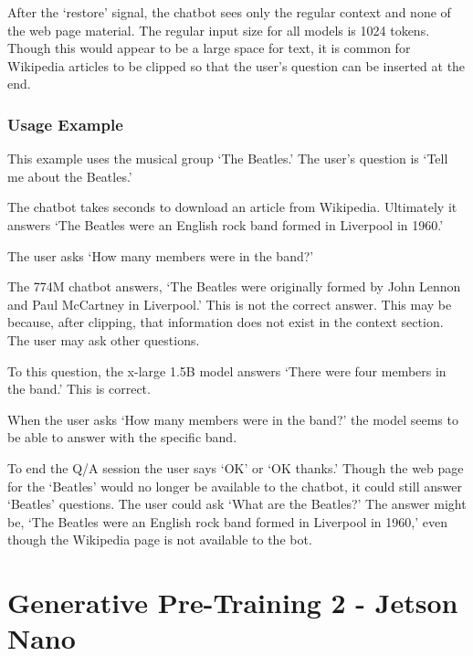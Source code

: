 
After the `restore' signal, the chatbot sees only the regular context and none of the web page material. The regular input size for all models is 1024 tokens. %
Though this would appear to be a large space for text, it is common for Wikipedia articles to be clipped so that the user's question can be inserted at the end.

\subsubsection{Usage Example}

This example uses the musical group `The Beatles.' The user's question is `Tell me about the Beatles.'

The chatbot takes seconds to download an article from Wikipedia. Ultimately it answers `The Beatles were an English rock band formed in Liverpool in 1960.'

The user asks `How many members were in the band?'

The 774M chatbot answers, `The Beatles were originally formed by John Lennon and Paul McCartney in Liverpool.' This is not the correct answer. This may be because, after clipping, that information does not exist in the context section. The user may ask other questions. %

To this question, the x-large 1.5B model answers `There were four members in the band.' This is correct.

When the user asks `How many members were in the band?' the model seems to be able to answer with the specific band. %

To end the Q/A session the user says `OK' or `OK thanks.' Though the web page for the `Beatles' would no longer be available to the chatbot, it could still answer `Beatles'  questions. The user could ask `What are the Beatles?' The answer might be, `The Beatles were an English rock band formed in Liverpool in 1960,' even though the Wikipedia page is not available to the bot.

\label{chapter-xlarge}

\section{Generative Pre-Training 2 - Jetson Nano}

